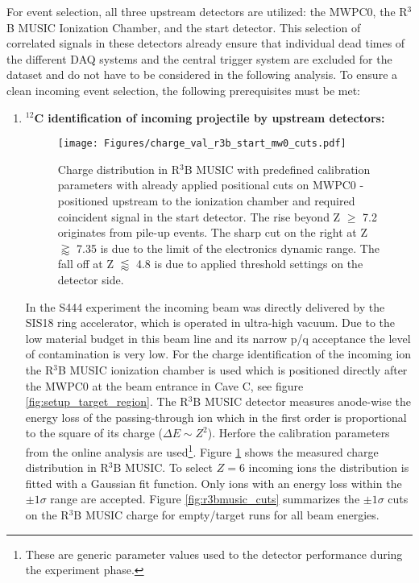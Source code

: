 For event selection, all three upstream detectors are utilized: the MWPC0, the R$^3$B MUSIC Ionization Chamber, and the start detector. This selection of correlated signals in these detectors already ensure that individual dead times of the different DAQ systems and the central trigger system are excluded for the dataset and do not have to be considered in the following analysis. To ensure a clean incoming event selection, the following prerequisites must be met:
\begin{enumerate}
\item \textbf{$^{12}$C identification of incoming projectile by upstream detectors:}\newline
\begin{figure}[htpb]
    \centering
    \texttt{[image: Figures/charge\_val\_r3b\_start\_mw0\_cuts.pdf]}
    \caption{
    Charge distribution in R$^3$B MUSIC with predefined calibration parameters with already applied positional cuts on MWPC0 - positioned upstream to the ionization chamber and required coincident signal in the start detector. The rise beyond Z $\ge$ 7.2 originates from pile-up events. The sharp cut on the right at Z $\gtrapprox$ 7.35 is due to the limit of the electronics dynamic range. The fall off at Z $\lessapprox$ 4.8 is due to applied threshold settings on the detector side.
    }
    \label{fig:r3bmusic_charge}
\end{figure}
In the S444 experiment the incoming beam was directly delivered by the SIS18 ring accelerator, which is operated in ultra-high vacuum. Due to the low material budget in this beam line and its narrow p/q acceptance the level of contamination is very low.\newline 
For the charge identification of the incoming ion the R$^3$B MUSIC ionization chamber is used which is positioned directly after the MWPC0 at the beam entrance in Cave C, see figure \ref{fig:setup_target_region}. The R$^3$B MUSIC detector measures anode-wise the energy loss of the passing-through ion which in the first order is proportional to the square of its charge ($\Delta E \sim Z^{2}$). Herfore the calibration parameters from the online analysis are used\footnote{These are generic parameter values used to the detector performance during the experiment phase.}. Figure \ref{fig:r3bmusic_charge} shows the measured charge distribution in R$^3$B MUSIC. To select $Z = 6$ incoming ions the distribution is fitted with a Gaussian fit function. Only ions with an energy loss within the $\pm 1 \sigma$ range are accepted. Figure \ref{fig:r3bmusic_cuts} summarizes the $\pm 1 \sigma$ cuts on the R$^3$B MUSIC charge for empty/target runs for all beam energies.   

\end{enumerate}
